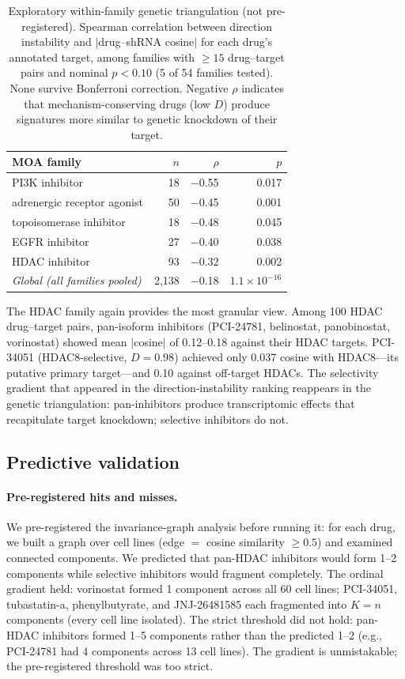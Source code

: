 \documentclass[11pt]{article}
\begin{document}
\begin{table}[t]
\centering
\caption{Exploratory within-family genetic triangulation (not
pre-registered). Spearman correlation between direction instability and
$|$drug--shRNA cosine$|$ for each drug's annotated target, among families
with $\geq 15$ drug--target pairs and nominal $p < 0.10$ (5 of 54 families
tested). None survive Bonferroni correction. Negative $\rho$ indicates that
mechanism-conserving drugs (low $D$) produce signatures more similar to
genetic knockdown of their target.}
\label{tab:triangulation}
\small
\begin{tabular}{lrrr}
\toprule
MOA family & $n$ & $\rho$ & $p$ \\
\midrule
PI3K inhibitor & 18 & $-$0.55 & 0.017 \\
adrenergic receptor agonist & 50 & $-$0.45 & 0.001 \\
topoisomerase inhibitor & 18 & $-$0.48 & 0.045 \\
EGFR inhibitor & 27 & $-$0.40 & 0.038 \\
HDAC inhibitor & 93 & $-$0.32 & 0.002 \\
\midrule
\emph{Global (all families pooled)} & 2{,}138 & $-$0.18 & $1.1 \times 10^{-16}$ \\
\bottomrule
\end{tabular}
\end{table}

The HDAC family again provides the most granular view. Among 100 HDAC
drug--target pairs, pan-isoform inhibitors (PCI-24781, belinostat,
panobinostat, vorinostat) showed mean $|$cosine$|$ of 0.12--0.18 against
their HDAC targets. PCI-34051 (HDAC8-selective, $D = 0.98$) achieved only
0.037 cosine with HDAC8---its putative primary target---and 0.10 against
off-target HDACs. The selectivity gradient that appeared in the
direction-instability ranking reappears in the genetic triangulation:
pan-inhibitors produce transcriptomic effects that recapitulate target
knockdown; selective inhibitors do not.

\subsection{Predictive validation}

\paragraph{Pre-registered hits and misses.}

We pre-registered the invariance-graph analysis before running it: for
each drug, we built a graph over cell lines (edge $=$ cosine similarity
$\geq 0.5$) and examined connected components. We predicted that
pan-HDAC inhibitors would form 1--2 components while selective
inhibitors would fragment completely. The ordinal gradient held:
vorinostat formed 1 component across all 60 cell lines; PCI-34051,
tubastatin-a, phenylbutyrate, and JNJ-26481585 each fragmented into
$K = n$ components (every cell line isolated). The strict threshold
did not hold: pan-HDAC inhibitors formed 1--5 components rather
than the predicted 1--2 (e.g., PCI-24781 had 4 components across
13 cell lines). The gradient is unmistakable; the pre-registered
threshold was too strict.
\end{document}
